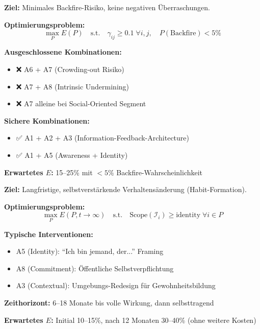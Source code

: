 \begin{tcolorbox}[colback=red!5!white, colframe=red!75!black,
    title=\textbf{Archetyp 4: 🛡️ Low-Risk Portfolio}]
\textbf{Ziel:} Minimales Backfire-Risiko, keine negativen Überraschungen.

\textbf{Optimierungsproblem:}
\begin{equation}
\max_{P} E(P) \quad \text{s.t.} \quad \gamma_{ij} \geq 0.1 \; \forall i,j, \quad P(\text{Backfire}) < 5\%
\end{equation}

\textbf{Ausgeschlossene Kombinationen:}
\begin{itemize}[nosep]
\item ❌ A6 + A7 (Crowding-out Risiko)
\item ❌ A7 + A8 (Intrinsic Undermining)
\item ❌ A7 alleine bei Social-Oriented Segment
\end{itemize}

\textbf{Sichere Kombinationen:}
\begin{itemize}[nosep]
\item ✅ A1 + A2 + A3 (Information-Feedback-Architecture)
\item ✅ A1 + A5 (Awareness + Identity)
\end{itemize}

\textbf{Erwartetes $E$:} 15--25\% mit $<5\%$ Backfire-Wahrscheinlichkeit
\end{tcolorbox}

\begin{tcolorbox}[colback=purple!5!white, colframe=purple!75!black,
    title=\textbf{Archetyp 5: 🔄 Sustainable Portfolio}]
\textbf{Ziel:} Langfristige, selbstverstärkende Verhaltensänderung (Habit-Formation).

\textbf{Optimierungsproblem:}
\begin{equation}
\max_{P} E(P, t \to \infty) \quad \text{s.t.} \quad \text{Scope}(\mathcal{I}_i) \geq \text{identity} \; \forall i \in P
\end{equation}

\textbf{Typische Interventionen:}
\begin{itemize}[nosep]
\item A5 (Identity): ``Ich bin jemand, der...'' Framing
\item A8 (Commitment): Öffentliche Selbstverpflichtung
\item A3 (Contextual): Umgebungs-Redesign für Gewohnheitsbildung
\end{itemize}

\textbf{Zeithorizont:} 6--18 Monate bis volle Wirkung, dann selbsttragend

\textbf{Erwartetes $E$:} Initial 10--15\%, nach 12 Monaten 30--40\% (ohne weitere Kosten)
\end{tcolorbox}

